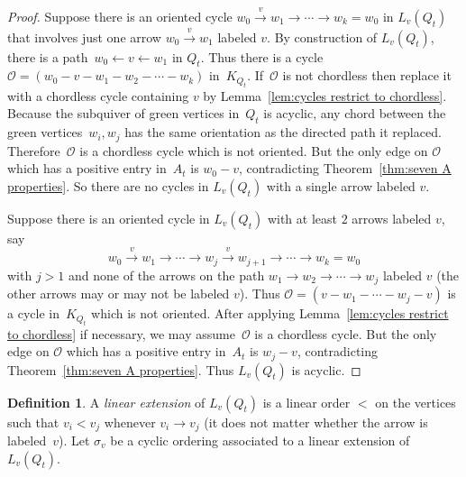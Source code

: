 \documentclass[11pt, letterpaper]{amsart}
\theoremstyle{definition}
\newtheorem{definition}[theorem]{Definition}
\numberwithin{equation}{section}
\newcommand{\Qtmut}{Q_t}
\newcommand{\Lgraph}{L}
\begin{document}
\begin{proof}
Suppose there is an oriented cycle $w_0 \stackrel{v}{\rightarrow} w_1 \rightarrow \cdots \rightarrow w_k = w_0$ in $\Lgraph_v(\Qtmut)$ that involves just one arrow $w_0 \stackrel{v}{\rightarrow} w_1$ labeled $v$.
By construction of $\Lgraph_v(\Qtmut)$, there is a path~${w_0 \leftarrow v \leftarrow w_1}$ in $\Qtmut$. 
Thus there is a cycle ${\mathcal O = (w_0 - v - w_1 - w_2- \cdots - w_k)}$ in~$K_{\Qtmut}$.
If~$\mathcal{O}$ is not chordless then replace it with a chordless cycle containing $v$ by Lemma~\ref{lem:cycles restrict to chordless}. 
Because the subquiver of green vertices in~$\Qtmut$ is acyclic, any chord between the green vertices~$w_i, w_j$ has the same orientation as the directed path it replaced. %
Therefore~$\mathcal{O}$ is a chordless cycle which is not oriented. %
But the only edge on $\mathcal O$ which has a positive entry in~$A_t$ is $w_0 - v$, contradicting Theorem~\ref{thm:seven A properties}.
So there are no cycles in $\Lgraph_v(\Qtmut)$ with a single arrow labeled $v$.

Suppose there is an oriented cycle in $\Lgraph_v(\Qtmut)$ with at least $2$ arrows labeled $v$, say
$$w_0 \stackrel{v}{\rightarrow} w_1 \rightarrow \cdots \rightarrow w_j \stackrel{v}{\rightarrow} w_{j+1} \rightarrow \cdots \rightarrow w_k = w_0$$ 
with $j>1$ and none of the arrows on the path $w_1 \rightarrow w_2 \rightarrow \cdots \rightarrow w_j$ labeled $v$ (the other arrows may or may not be labeled $v$).
Thus $\mathcal O = (v - w_1 - \cdots - w_j - v)$ is a cycle in~$K_{\Qtmut}$ which is {not} oriented.
After applying Lemma~\ref{lem:cycles restrict to chordless} if necessary, we may assume~$\mathcal O$ is a chordless cycle.
But the only edge on $\mathcal O$ which has a positive entry in~$A_t$ is $w_j - v$, contradicting Theorem~\ref{thm:seven A properties}. %
Thus $\Lgraph_v(\Qtmut)$ is acyclic.
\end{proof}


\begin{definition}
\label{def:order from tilde}
A \emph{linear extension} of $\Lgraph_{v}(\Qtmut)$ is a linear order $<$ on the vertices such that $v_i < v_j$ whenever $v_i  \rightarrow v_j$ (it does not matter whether the arrow is labeled~$v$). %
Let $\sigma_{v}$ be a cyclic ordering associated to a linear extension of $\Lgraph_{v}(\Qtmut)$.
\end{definition}
\end{document}
